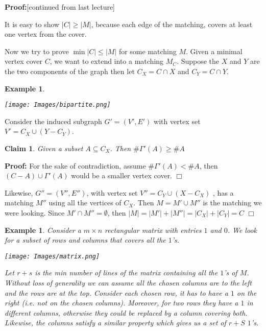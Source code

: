 \documentclass[11pt]{article}
\newtheorem{claim}[theorem]{Claim}
\newtheorem{example}[theorem]{Example}
\newenvironment{proof}{\noindent \textbf{Proof:}}{$\Box$}
\newcommand{\ignore}[1]{} %
\begin{document}
\begin{proof}[continued from last lecture] 

It is easy to show $|C|\geq |M|$, because each edge of the matching, covers at least one vertex from the cover.

Now we try to prove $\min |C| \leq |M|$ for some matching $M$. Given a minimal vertex cover $C$, we want to extend into a matching $M_C$. Suppose the $X$ and $Y$ are the two components of the graph then let $C_X=C\cap X$ and $C_Y=C\cap Y$.

\begin{example}

\

\begin{center}
 \texttt{[image: Images/bipartite.png]}
\end{center}

\end{example}

\ignore{Need to define C_X and C_Y} 
Consider the induced subgraph $G'=(V',E')$ with vertex set $V'=C_X  \cup (Y-C_Y)$. 

\begin{claim}
Given a subset $A\subseteq C_X$. Then $\#\Gamma'(A)\geq \#A$
\end{claim}

\begin{proof}
For the sake of contradiction, assume $\#\Gamma'(A)< \#A$, then $(C-A) \cup \Gamma'(A)$ would be a smaller vertex cover.
\end{proof}

Likewise, $G''=(V'',E'')$, with vertex set $V''=C_Y \cup (X-C_X)$%
, has a matching $M''$ using all the vertices of $C_X$. Then $M=M'\cup M''$ is the matching we were looking. Since $M'\cap M''=\emptyset$, then $|M|=|M'|+|M''|=|C_X|+|C_Y|=C$
\end{proof}

\begin{example}
Consider a $m\times n$ rectangular matrix with entries $1$ and $0$. We look for a subset of rows and columns that covers all the $1$'s. 

\begin{center}
 \texttt{[image: Images/matrix.png]}
\end{center}

Let $r+s$ is the min number of lines of the matrix containing all the $1$'s of $M$. Without loss of generality we can assume all the chosen columns are to the left and the rows are at the top. Consider each chosen row, it has to have a $1$ on the right (i.e. not on the chosen columns). Moreover, for two rows they have a $1$ in different columns, otherwise they could be replaced by a column covering both. Likewise, the columns satisfy a similar property which gives us a set of $r+S$ $1$'s.
\end{example}
\end{document}
